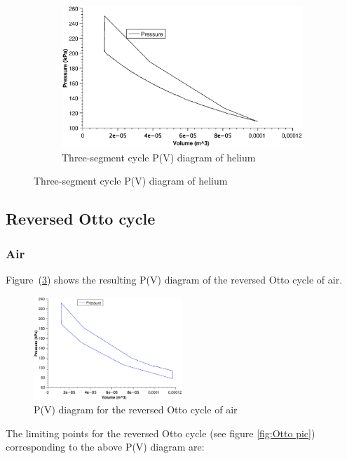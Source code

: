 \documentclass{scrartcl}
\begin{document}
\begin{figure}[!ht]
\begin{subfigure}[b]{0.3\textwidth}
     \end{subfigure}
     \hfill
     \begin{subfigure}[b]{0.3\textwidth}
         \centering
         \includegraphics[width=\textwidth]{3seg/PV_helium_3seg.eps}
         \caption{Three-segment cycle P(V) diagram of helium}
         \label{fig:3seg_helium}
     \end{subfigure}
\end{figure}
\FloatBarrier


\subsection{Reversed Otto cycle}

\subsubsection{Air}
Figure~(\ref{fig:pVOttoAir}) shows the resulting P(V) diagram of the reversed Otto cycle of air.
\begin{figure}[!ht]
    \centering
    \includegraphics[width=0.5\textwidth]{PV_air_O.eps}
    \caption{P(V) diagram for the reversed Otto cycle of air}
    \label{fig:pVOttoAir}
\end{figure}

The limiting points for the reversed Otto cycle (see figure \ref{fig:Otto pic}) corresponding to the above P(V) diagram  are:
\end{document}
